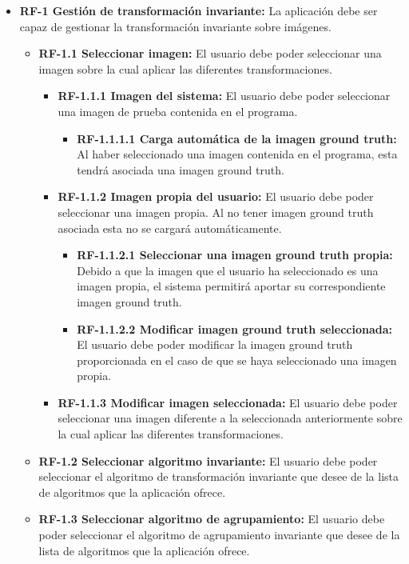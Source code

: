 \begin{itemize}
    \item \textbf{RF-1 Gestión de transformación invariante:} La aplicación debe ser capaz de gestionar la transformación invariante sobre imágenes.
    \begin{itemize}
        \item \textbf{RF-1.1 Seleccionar imagen:} El usuario debe poder seleccionar una imagen sobre la cual aplicar las diferentes transformaciones.
        \begin{itemize}
            \item \textbf{RF-1.1.1 Imagen del sistema:} El usuario debe poder seleccionar una imagen de prueba contenida en el programa.
            \begin{itemize}
                \item \textbf{RF-1.1.1.1 Carga automática de la imagen ground truth:} Al haber seleccionado una imagen contenida en el programa, esta tendrá asociada una imagen ground truth.
            \end{itemize}
            \item \textbf{RF-1.1.2 Imagen propia del usuario:} El usuario debe poder seleccionar una imagen propia. Al no tener imagen ground truth asociada esta no se cargará automáticamente.
            \begin{itemize}
                \item \textbf{RF-1.1.2.1 Seleccionar una imagen ground truth propia:} Debido a que la imagen que el usuario ha seleccionado es una imagen propia, el sistema permitirá aportar su correspondiente imagen ground truth.
                \item \textbf{RF-1.1.2.2 Modificar imagen ground truth seleccionada:} El usuario debe poder modificar la imagen ground truth proporcionada en el caso de que se haya seleccionado una imagen propia.
            \end{itemize}
            \item \textbf{RF-1.1.3 Modificar imagen seleccionada:} El usuario debe poder seleccionar una imagen diferente a la seleccionada anteriormente sobre la cual aplicar las diferentes transformaciones.
        \end{itemize}
        \item \textbf{RF-1.2 Seleccionar algoritmo invariante:} El usuario debe poder seleccionar el algoritmo de transformación invariante que desee de la lista de algoritmos que la aplicación ofrece.
        \item \textbf{RF-1.3 Seleccionar algoritmo de agrupamiento:} El usuario debe poder seleccionar el algoritmo de agrupamiento invariante que desee de la lista de algoritmos que la aplicación ofrece.

\end{itemize}
\end{itemize}
